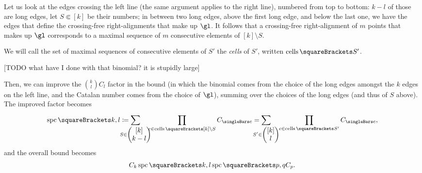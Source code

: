 \documentclass[10pt, a4paper, twoside]{basestyle}
\DeclareMathOperator{\cells}{cells}
\DeclareMathOperator{\spc}{spc}
\begin{document}
Let us look at the edges crossing the left line (the same argument applies to the right line),
numbered from top to bottom: $k-l$ of those are
long edges, let $S \Subset [k]$ be their numbers; in between two long edges, above the first
long edge, and below the last one, we have the edges that define the crossing-free right-alignments
that make up $\gl$. It follows that a crossing-free right-alignment of $m$ points that makes up
$\gl$ corresponds to a maximal sequence of $m$ consecutive elements of $[k] \setminus S$.

We will call the set of maximal sequences of consecutive elements of $S'$ the \emph{cells} of
$S'$, written $\cells\of{S'}$.

[TODO what have I done with that binomial? it is stupidly large]

Then, we can improve the $\binom k l C_l$ factor in the bound (in which the binomial comes from
the choice of the long edges amongst the $k$ edges on the left line, and the Catalan number comes
from the choice of $\gl$), summing over the choices of the long edges (and thus of $S$ above).
The improved factor becomes\[
\spc\of{k, l}\DefineAs
\sum{S\in\binom{[k]}{k-l}} \quad \prod{c\in\cells\of{[k] \setminus S}}C_{\Cardinality c} =
\sum{S'\in\binom{[k]}{l}} \quad \prod{c\in\cells\of{S'}}C_{\Cardinality c}\text,
\]
and the overall bound becomes\[
C_k\spc\of{k, l}\spc\of{p, q}C_p\text.
\]
\end{document}
